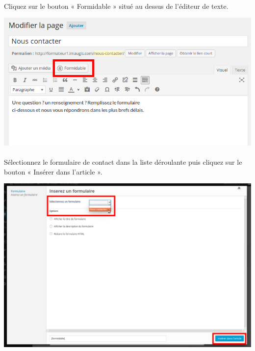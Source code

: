\documentclass[10pt,a4paper]{article}
\begin{document}
\paragraph{}Cliquez sur le bouton « Formidable » situé au dessus de l'éditeur de texte.
\begin{center}
\includegraphics[scale=0.3]{img/0189.png}
\end{center}
\paragraph{}Sélectionnez le formulaire de contact dans la liste déroulante puis cliquez sur le bouton « Insérer dans l'article ».
\begin{center}
\includegraphics[scale=0.25]{img/0190.png}
\end{center}
\end{document}

